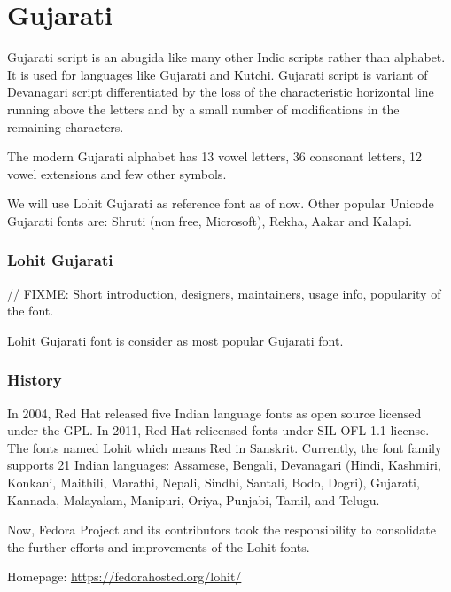 \chapter{Gujarati}

Gujarati script is an abugida like many other Indic scripts rather than
alphabet. It is used for languages like Gujarati and Kutchi. Gujarati script is
variant of Devanagari script differentiated by the loss of the characteristic
horizontal line running above the letters and by a small number of
modifications in the remaining characters.

The modern Gujarati alphabet has 13 vowel letters, 36 consonant letters, 12
vowel extensions and few other symbols.


We will use Lohit Gujarati as reference font as of now. Other popular Unicode
Gujarati fonts are: Shruti (non free, Microsoft), Rekha, Aakar and Kalapi.

\subsection{Lohit Gujarati}
// FIXME: Short introduction, designers, maintainers, usage info, popularity of
the font.

Lohit Gujarati font is consider as most popular Gujarati font.

\subsection{History}
In 2004, Red Hat released five Indian language fonts as open source licensed
under the GPL. In 2011, Red Hat relicensed fonts under SIL OFL 1.1 license.
The fonts named Lohit which means Red in Sanskrit. Currently, the font family
supports 21 Indian languages: Assamese, Bengali, Devanagari (Hindi, Kashmiri,
Konkani, Maithili, Marathi, Nepali, Sindhi, Santali, Bodo, Dogri), Gujarati,
Kannada, Malayalam, Manipuri, Oriya, Punjabi, Tamil, and Telugu.

Now, Fedora Project and its contributors took the responsibility to consolidate
the further efforts and improvements of the Lohit fonts.

Homepage: {\url{https://fedorahosted.org/lohit/}}

